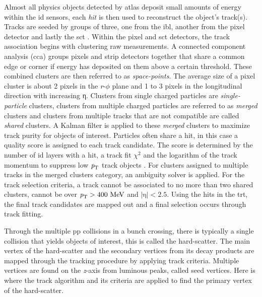 Almost all physics objects detected by \gls{atlas} deposit small amounts of energy within the \gls{id} sensors, each \textit{hit} is then used to reconstruct the object's 
track(s). Tracks are seeded by groups of three, one from the \gls{ibl}, another from the pixel detector and lastly the \gls{sct} \cite{track-reco}. Within the pixel and \gls{sct}
detectors, the track association begins with clustering raw measurements. A connected component analysis (\gls{cca}) \cite{cca} groups pixels and strip detectors together that share
a common edge or corner if energy has deposited on them above a certain threshold. These combined clusters are then referred to as \textit{space-points}. The average size of a
pixel cluster is about 2 pixels in the \textit{r}-$\phi$ plane and 1 to 3 pixels in the longitudinal direction with increasing η. Clusters from single charged particles are 
\textit{single-particle} clusters, clusters from multiple charged particles are referred to as \textit{merged} clusters and clusters from multiple tracks that are not 
compatible are called \textit{shared} clusters. A Kalman filter \cite{kalman} is applied to these \textit{merged} 
clusters to maximize track purity for objects of interest. Particles often share a hit, in this case a quality score is assigned to each track candidate. The score is 
determined by the number of \gls{id} layers with a hit, a track fit $\chi^{\textrm{2}}$ and the logarithm of the track momentum to suppress low $\textit{\textit{p}}_{\textrm{T}}$ 
track objects \cite{track-reco,newt}. For clusters assigned to multiple tracks in the merged clusters category, an ambiguity solver is applied. For the track selection criteria,
a track cannot be associated to no more than two shared clusters, cannot be over $\textit{\textit{p}}_{\textrm{T}} > \textrm{400 MeV}$ and $|\textrm{η}| < \textrm{2.5}$.
Using the hits in the \gls{trt}, the final track candidates are mapped out and a final selection occurs through track fitting. 
\par
Through the multiple \gls{pp} collisions in a bunch crossing, there is typically a single collision that yields objects of interest, this is called the hard-scatter. 
The main vertex of the hard-scatter and the secondary vertices from its decay products are mapped through the tracking procedure by applying track criteria. Multiple vertices
are found on the \textit{z}-axis from luminous peaks, called seed vertices. Here is where the track algorithm and its criteria are applied to find the primary vertex 
of the hard-scatter.

